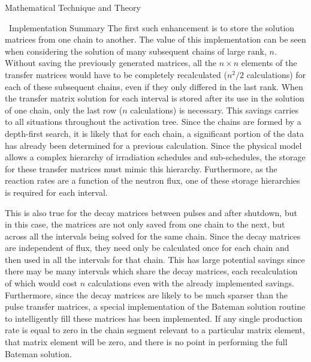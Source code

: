 \begin{chapter}{Mathematical Technique and Theory}
\begin{section}{\ALARA\ Implementation Summary}
  The first such enhancement is to store the solution matrices from
  one chain to another.  The value of this implementation can be seen
  when considering the solution of many subsequent chains of large
  rank, $n$.  Without saving the previously generated matrices, all
  the $n\times n$ elements of the transfer matrices would have to be
  completely recalculated ($n^2/2$ calculations) for each of these
  subsequent chains, even if they only differed in the last rank.
  When the transfer matrix solution for each interval is stored after
  its use in the solution of one chain, only the last row ($n$
  calculations) is necessary.  This savings carries to all situations
  throughout the activation tree.  Since the chains are formed by a
  depth-first search, it is likely that for each chain, a significant
  portion of the data has already been determined for a previous
  calculation.  Since the physical model allows a complex hierarchy of
  irradiation schedules and sub-schedules, the storage for these
  transfer matrices must mimic this hierarchy.  Furthermore, as the
  reaction rates are a function of the neutron flux, one of these
  storage hierarchies is required for each interval.
  
  This is also true for the decay matrices between pulses and after
  shutdown, but in this case, the matrices are not only saved from one
  chain to the next, but across all the intervals being solved for the
  same chain.  Since the decay matrices are independent of flux, they
  need only be calculated once for each chain and then used in all the
  intervals for that chain.  This has large potential savings since
  there may be many intervals which share the decay matrices, each
  recalculation of which would cost $n$ calculations even with the
  already implemented savings.  Furthermore, since the decay matrices
  are likely to be much sparser than the pulse transfer matrices, a
  special implementation of the Bateman solution routine to
  intelligently fill these matrices has been implemented.  If any
  single production rate is equal to zero in the chain segment
  relevant to a particular matrix element, that matrix element will be
  zero, and there is no point in performing the full Bateman solution.
  

\end{section}
\end{chapter}
